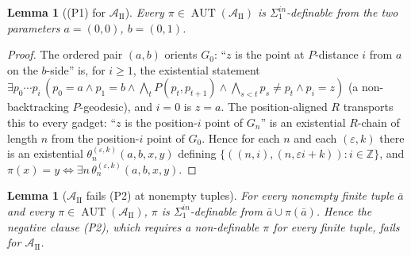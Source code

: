 \documentclass[12pt,fullpage]{article}
\newtheorem{lemma}[theorem]{Lemma}
\theoremstyle{definition}
\newcommand{\A}{\mathcal{A}}
\newcommand{\Z}{{\mathbb{Z}}}
\newcommand{\AUT}{\operatorname{AUT}}
\begin{document}
\begin{lemma}[(P1) for $\A_{\mathrm{II}}$]\label{lem:AII-P1}
Every $\pi\in\AUT(\A_{\mathrm{II}})$ is $\Sigma^{in}_1$-definable from the two
parameters $a=(0,0)$, $b=(0,1)$.
\end{lemma}

\begin{proof}
The ordered pair $(a,b)$ orients $G_0$: ``$z$ is the point at $P$-distance $i$
from $a$ on the $b$-side'' is, for $i\ge1$, the existential statement
$\exists p_0\cdots p_i\,(p_0=a\wedge p_1=b\wedge\bigwedge_t P(p_t,p_{t+1})\wedge
\bigwedge_{s<t}p_s\neq p_t\wedge p_i=z)$ (a non-backtracking $P$-geodesic), and
$i=0$ is $z=a$.  The position-aligned $R$ transports this to every gadget: ``$z$
is the position-$i$ point of $G_n$'' is an existential $R$-chain of length $n$
from the position-$i$ point of $G_0$.  Hence for each $n$ and each
$(\varepsilon,k)$ there is an existential
$\theta_n^{(\varepsilon,k)}(a,b,x,y)$ defining
$\{((n,i),(n,\varepsilon i+k)):i\in\Z\}$, and $\pi(x)=y\iff\exists
n\,\theta_n^{(\varepsilon,k)}(a,b,x,y)$.
\end{proof}

\begin{lemma}[$\A_{\mathrm{II}}$ fails (P2) at nonempty tuples]\label{lem:AII-fail}
For every \emph{nonempty} finite tuple $\bar a$ and every
$\pi\in\AUT(\A_{\mathrm{II}})$, $\pi$ is $\Sigma^{in}_1$-definable from
$\bar a\cup\pi(\bar a)$.  Hence the negative clause (P2), which requires a
non-definable $\pi$ for \emph{every} finite tuple, fails for $\A_{\mathrm{II}}$.
\end{lemma}
\end{document}
